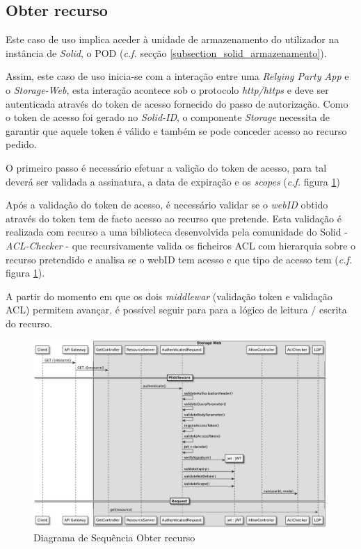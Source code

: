 \subsection{Obter recurso}
Este caso de uso implica aceder à unidade de armazenamento do utilizador na instância de \emph{Solid}, o POD (\emph{c.f.} secção \ref{subsection_solid_armazenamento}). 

Assim, este caso de uso inicia-se com a interação entre uma \emph{Relying Party App} e o \emph{Storage-Web}, esta interação acontece sob o protocolo \emph{http/https} e deve ser autenticada através do token de acesso fornecido do passo de autorização.
Como o token de acesso foi gerado no \emph{Solid-ID}, o componente \emph{Storage} necessita de garantir que aquele token é válido e também se pode conceder acesso ao recurso pedido.

O primeiro passo é necessário efetuar a valição do token de acesso, para tal deverá ser validada a assinatura, a data de expiração e os \emph{scopes} (\emph{c.f.} figura \ref{retrieve_resource_sd})

Após a validação do token de acesso, é necessário validar se o \emph{webID} obtido através do token tem de facto acesso ao recurso que pretende. Esta validação é realizada com recurso a uma biblioteca desenvolvida pela comunidade do Solid - \emph{ACL-Checker} - que recursivamente valida os ficheiros ACL com hierarquia sobre o recurso pretendido e analisa se o webID tem acesso e que tipo de acesso tem (\emph{c.f.} figura \ref{retrieve_resource_sd}).

A partir do momento em que os dois \emph{middlewar} (validação token e validação ACL) permitem avançar, é possível seguir para para a lógico de leitura / escrita do recurso.

\begin{figure}[H]
    \begin{center}
    \includegraphics[width=1 \textwidth]{figures/retrieve_resource_sd_complete.eps}
    \caption{Diagrama de Sequência Obter recurso}
            \label{retrieve_resource_sd}
    \end{center}
\end{figure}












